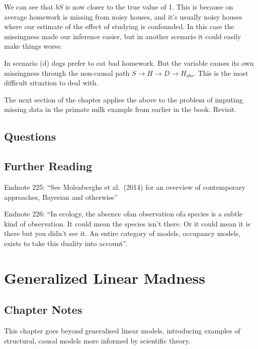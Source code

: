 \documentclass[
]{book}
\begin{document}
We can see that \(bS\) is now closer to the true value of 1. This is because on average homework is missing from noisy houses, and it's usually noisy houses where our estimate of the effect of studying is confounded. In this case the missingness made our inference easier, but in another scenario it could easily make things worse.

In scenario (d) dogs prefer to eat bad homework. But the variable causes its own missingness through the non-causal path \(S \rightarrow H \rightarrow D \rightarrow H_{obs}\). This is the most difficult situation to deal with.

The next section of the chapter applies the above to the problem of imputing missing data in the primate milk example from earlier in the book. Revisit.

\hypertarget{questions-14}{%
\section{Questions}\label{questions-14}}

\hypertarget{further-reading-8}{%
\section*{Further Reading}\label{further-reading-8}}

Endnote 225: ``See Molenberghs et al.~(2014) for an overview of contemporary approaches, Bayesian and otherwise''

Endnote 226: ``In ecology, the absence ofan observation ofa species is a subtle kind of observation. It could mean the species isn't there. Or it could mean it is there but you didn't see it. An entire category of models, occupancy models, exists to take this duality into account''.

\hypertarget{generalized}{%
\chapter{Generalized Linear Madness}\label{generalized}}

\hypertarget{chapter-notes-15}{%
\section{Chapter Notes}\label{chapter-notes-15}}

This chapter goes beyond generalised linear models, introducing examples of structural, causal models more informed by scientific theory.
\end{document}
